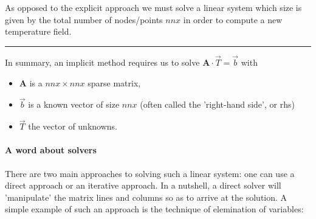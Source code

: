 \begin{center}
\begin{minipage}[t]{0.77\textwidth}
As opposed to the explicit approach we must solve a linear system which size is given 
by the total number of nodes/points $nnx$ in order to compute a new temperature field.

\par\noindent\rule{\textwidth}{0.4pt}
\end{minipage}
\end{center}


In summary, an implicit method requires us to solve ${\bm A}\cdot\vec{T} = \vec{b}$ with
\begin{itemize}
\item ${\bm A}$ is a $nnx \times nnx$  {\color{olive}sparse} matrix,
\item ${\vec b}$ is a known vector of size $nnx$ (often called the 'right-hand side', or {\color{olive} rhs})
\item ${\vec T}$ the vector of unknowns.
\end{itemize}

\paragraph{A word about solvers}
There are two main approaches to solving such a linear system: one can use a {\color{olive} direct}
approach or an {\color{olive} iterative} approach. 
In a nutshell, a direct solver will 'manipulate' the matrix lines and columns 
so as to arrive at the solution. A simple example of such an approach is the 
technique of elemination of variables:


